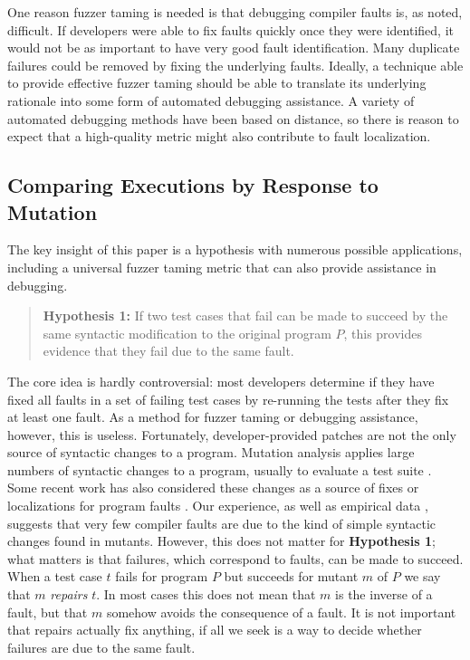 One reason fuzzer taming is needed is that debugging compiler faults is, as noted, difficult.  If developers were able to fix faults quickly once they were identified, it would not be as important to have very good fault identification.  Many duplicate failures could be removed by fixing the underlying faults.  Ideally, a technique able to provide effective fuzzer taming should be able to translate its underlying rationale into some form of automated debugging assistance.   A variety of automated debugging methods \cite{NearNeighbor,GroceError} have been based on distance, so there is reason to expect that a high-quality metric might also contribute to fault localization.

\subsection{Comparing Executions by Response to Mutation}

The key insight of this paper is a hypothesis with numerous possible applications, including a universal fuzzer taming metric that can also provide assistance in debugging.  

\begin{quote}
{\bf Hypothesis 1:} If two test cases that fail can be made to succeed by the same syntactic modification to the original program $P$, this provides evidence that they fail due to the same fault.
\end{quote}

The core idea is hardly controversial:  most developers determine if they have fixed all faults in a set of failing test cases by re-running the tests after they fix at least one fault.  As a method for fuzzer taming or debugging assistance, however, this is useless.  Fortunately, developer-provided patches are not the only source of syntactic changes to a program.  Mutation analysis \cite{demillo1978hints,budd1980theoretical} applies large numbers of syntactic changes to a program, usually to evaluate a test suite \cite{mutant,justmutants}.  Some recent work has also considered these changes as a source of fixes or localizations for program faults \cite{achour,multilingual,MUSE,DebroyMutant}.  Our experience, as well as empirical data \cite{GopinathMutants}, suggests that very few compiler faults are due to the kind of simple syntactic changes found in mutants.  However, this does not matter for {\bf Hypothesis 1};  what matters is that failures, which correspond to faults, can be made to succeed.  When a test case $t$ fails for program $P$ but succeeds for mutant $m$ of $P$ we say that $m$ \emph{repairs} $t$.  In most cases this does not mean that $m$ is the inverse of a fault, but that $m$ somehow avoids the consequence of a fault.  It is not important that repairs actually fix anything, if all we seek is a way to decide whether failures are due to the same fault.

